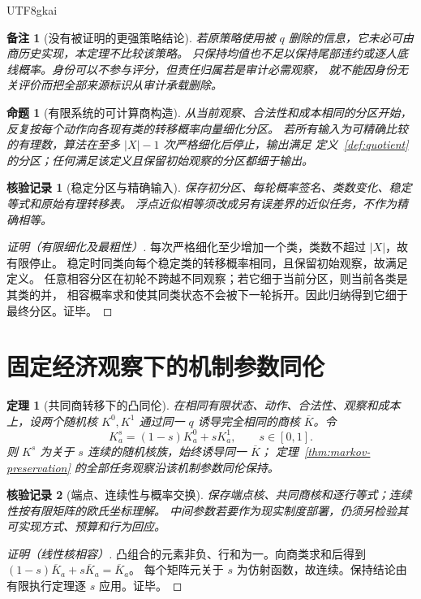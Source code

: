 \documentclass[12pt,a4paper,openany]{report}
\newtheorem{theorem}{定理}[chapter]
\newtheorem{proposition}{命题}[chapter]
\newtheorem{remark}{备注}[chapter]
\newtheorem{Certificate}{核验记录}[chapter]
\begin{document}
\begin{CJK*}{UTF8}{gkai}
\begin{remark}[没有被证明的更强策略结论]
若原策略使用被 $q$ 删除的信息，它未必可由商历史实现，本定理不比较该策略。
只保持均值也不足以保持尾部违约或逐人底线概率。身份可以不参与评分，但责任归属若是审计必需观察，
就不能因身份无关评价而把全部来源标识从审计承载删除。
\end{remark}

\begin{proposition}[有限系统的可计算商构造]
\label{prop:partition}
从当前观察、合法性和成本相同的分区开始，反复按每个动作向各现有类的转移概率向量细化分区。
若所有输入为可精确比较的有理数，算法在至多 $|X|-1$ 次严格细化后停止，输出满足
定义~\ref{def:quotient} 的分区；任何满足该定义且保留初始观察的分区都细于输出。
\end{proposition}
\begin{Certificate}[稳定分区与精确输入]
保存初分区、每轮概率签名、类数变化、稳定等式和原始有理转移表。
浮点近似相等须改成另有误差界的近似任务，不作为精确相等。
\end{Certificate}
\begin{proof}[证明（有限细化及最粗性）]
每次严格细化至少增加一个类，类数不超过 $|X|$，故有限停止。
稳定时同类向每个稳定类的转移概率相同，且保留初始观察，故满足定义。
任意相容分区在初轮不跨越不同观察；若它细于当前分区，则当前各类是其类的并，
相容概率求和使其同类状态不会被下一轮拆开。因此归纳得到它细于最终分区。证毕。
\end{proof}

\section{固定经济观察下的机制参数同伦}

\begin{theorem}[共同商转移下的凸同伦]
\label{thm:kernel-homotopy}
在相同有限状态、动作、合法性、观察和成本上，设两个随机核 $K^0,K^1$ 通过同一 $q$
诱导完全相同的商核 $\overline K$。令
\[
 K^s_a=(1-s)K^0_a+sK^1_a,\qquad s\in[0,1].
\]
则 $K^s$ 为关于 $s$ 连续的随机核族，始终诱导同一 $\overline K$；
定理~\ref{thm:markov-preservation} 的全部任务观察沿该机制参数同伦保持。
\end{theorem}
\begin{Certificate}[端点、连续性与概率交换]
保存端点核、共同商核和逐行等式；连续性按有限矩阵的欧氏坐标理解。
中间参数若要作为现实制度部署，仍须另检验其可实现方式、预算和行为回应。
\end{Certificate}
\begin{proof}[证明（线性核相容）]
凸组合的元素非负、行和为一。向商类求和后得到
$(1-s)\overline K_a+s\overline K_a=\overline K_a$。
每个矩阵元关于 $s$ 为仿射函数，故连续。保持结论由有限执行定理逐 $s$ 应用。证毕。
\end{proof}


\end{CJK*}
\end{document}
